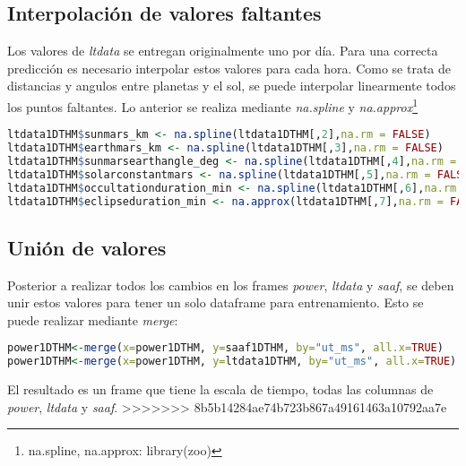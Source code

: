 \documentclass[../Main.tex]{subfiles}
\begin{document}
\subsection{Interpolación de valores faltantes}

Los valores de \textit{ltdata} se entregan originalmente uno por día. Para una correcta predicción es necesario interpolar estos valores para cada hora. Como se trata de distancias y angulos entre planetas y el sol, se puede interpolar linearmente todos los puntos faltantes. Lo anterior se realiza mediante \textit{na.spline} y \textit{na.approx}\footnote{na.spline, na.approx: library(zoo)}
\newline \par
\begin{lstlisting}[language=R]
ltdata1DTHM$sunmars_km <- na.spline(ltdata1DTHM[,2],na.rm = FALSE)
ltdata1DTHM$earthmars_km <- na.spline(ltdata1DTHM[,3],na.rm = FALSE)
ltdata1DTHM$sunmarsearthangle_deg <- na.spline(ltdata1DTHM[,4],na.rm = FALSE)
ltdata1DTHM$solarconstantmars <- na.spline(ltdata1DTHM[,5],na.rm = FALSE)
ltdata1DTHM$occultationduration_min <- na.spline(ltdata1DTHM[,6],na.rm = FALSE)
ltdata1DTHM$eclipseduration_min <- na.approx(ltdata1DTHM[,7],na.rm = FALSE, rule=2)
\end{lstlisting}

\subsection{Unión de valores}
Posterior a realizar todos los cambios en los frames \textit{power}, \textit{ltdata} y \textit{saaf}, se deben unir estos valores para tener un solo dataframe para entrenamiento. Esto se puede realizar mediante \textit{merge}:
\newline \par
\begin{lstlisting}[language=R]
power1DTHM<-merge(x=power1DTHM, y=saaf1DTHM, by="ut_ms", all.x=TRUE)
power1DTHM<-merge(x=power1DTHM, y=ltdata1DTHM, by="ut_ms", all.x=TRUE)
\end{lstlisting}
El resultado es un frame que tiene la escala de tiempo, todas las columnas de \textit{power}, \textit{ltdata} y \textit{saaf}.
>>>>>>> 8b5b14284ae74b723b867a49161463a10792aa7e
\end{document}
